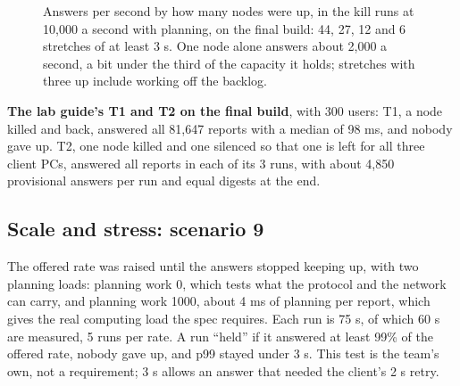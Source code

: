 \begin{figure}[!htb]
\centering
{}
\caption{Answers per second by how many nodes were up, in the kill runs at 10,000 a second with planning, on the final build: 44, 27, 12 and 6 stretches of at least 3 s. One node alone answers about 2,000 a second, a bit under the third of the capacity it holds; stretches with three up include working off the backlog.}
\label{fig:bynodes}
\end{figure}

\textbf{The lab guide's T1 and T2 on the final build}, with 300 users: T1, a node killed and back, answered all 81,647 reports with a median of 98 ms, and nobody gave up. T2, one node killed and one silenced so that one is left for all three client PCs, answered all reports in each of its 3 runs, with about 4,850 provisional answers per run and equal digests at the end.

\subsection{Scale and stress: scenario 9}
\label{sec:stress}

The offered rate was raised until the answers stopped keeping up, with two planning loads: planning work 0, which tests what the protocol and the network can carry, and planning work 1000, about 4 ms of planning per report, which gives the real computing load the spec requires. Each run is 75 s, of which 60 s are measured, 5 runs per rate. A run ``held'' if it answered at least 99\% of the offered rate, nobody gave up, and p99 stayed under 3 s. This test is the team's own, not a requirement; 3 s allows an answer that needed the client's 2 s retry.

